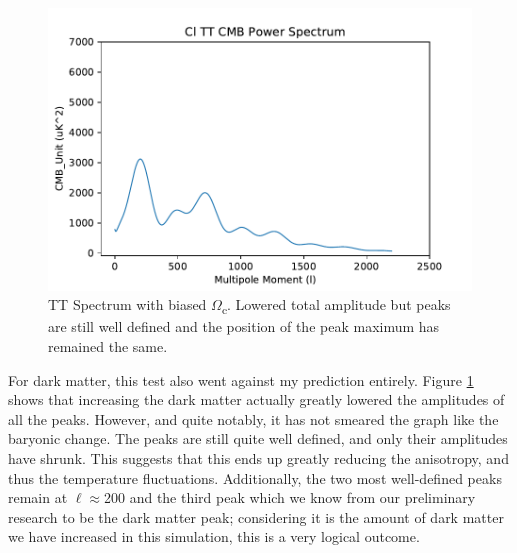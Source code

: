 \documentclass[twoside, fontsize=12pt,
     bibliography=totoc, %
     listof=totoc, %
     index=totoc, %
     onehalfspacing %
]{_MScDiss2017_cls}
\begin{document}
\begin{figure}
	\begin{center}
	\includegraphics{4Cl-TT-vs-l}
	\caption{TT Spectrum with biased $\Omega$\textsubscript{c}. Lowered total amplitude but peaks are still well defined and the position of the peak maximum has remained the same.}
	\label{fig:cbias}
	\end{center}
\end{figure}

For dark matter, this test also went against my prediction entirely. Figure \ref{fig:cbias} shows that increasing the dark matter actually greatly lowered the amplitudes of all the peaks. However, and quite notably, it has not smeared the graph like the baryonic change. The peaks are still quite well defined, and only their amplitudes have shrunk. This suggests that this ends up greatly reducing the anisotropy, and thus the temperature fluctuations. Additionally, the two most well-defined peaks remain at $\ell$$\approx$200 and the third peak which we know from our preliminary research to be the dark matter peak; considering it is the amount of dark matter we have increased in this simulation, this is a very logical outcome.
\end{document}
